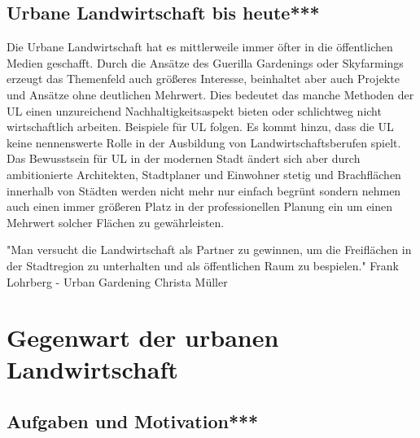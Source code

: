 \documentclass{scrartcl}
\begin{document}
\subsection{Urbane Landwirtschaft bis heute***}

Die Urbane Landwirtschaft hat es mittlerweile immer öfter in die öffentlichen Medien geschafft. Durch die Ansätze des Guerilla Gardenings oder Skyfarmings erzeugt das Themenfeld auch größeres Interesse, beinhaltet aber auch Projekte und Ansätze ohne deutlichen Mehrwert. Dies bedeutet das manche Methoden der UL einen unzureichend Nachhaltigkeitsaspekt bieten oder schlichtweg nicht wirtschaftlich arbeiten. Beispiele für UL folgen. Es kommt hinzu, dass die UL keine nennenswerte Rolle in der Ausbildung von Landwirtschaftsberufen spielt. Das Bewusstsein für UL in der modernen Stadt ändert sich aber durch ambitionierte Architekten, Stadtplaner und Einwohner stetig und Brachflächen innerhalb von Städten werden nicht mehr nur einfach begrünt sondern nehmen auch einen immer größeren Platz in der professionellen Planung ein um einen Mehrwert solcher Flächen zu gewährleisten.

"Man versucht die Landwirtschaft als Partner zu gewinnen, um die Freiflächen in der Stadtregion zu unterhalten und als öffentlichen Raum zu bespielen." Frank Lohrberg - Urban Gardening Christa Müller

\section{Gegenwart der urbanen Landwirtschaft}
\subsection{Aufgaben und Motivation***}
\end{document}
